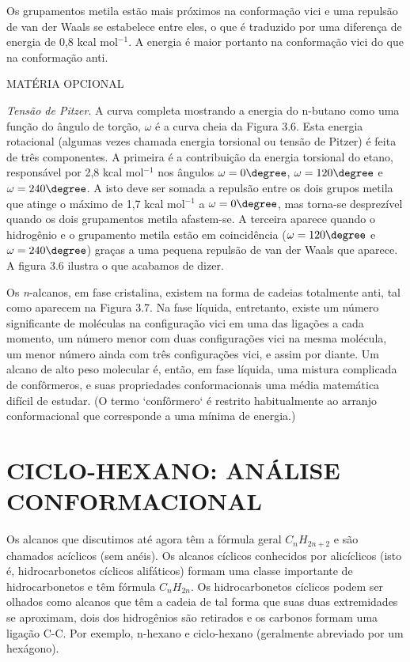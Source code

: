 Os grupamentos metila estão mais próximos na conformação vici e uma repulsão de van der Waals se estabelece entre eles, o que é traduzido por uma diferença de energia de 0,8 kcal mol$^{-1}$. A energia é maior portanto na conformação vici do que na conformação anti.

\par\bigskip
\begin{leftbar}[cut=false]
\footnotesize

\noindent MATÉRIA OPCIONAL

\noindent\emph{Tensão de Pitzer}. A curva completa mostrando a energia do n-butano como uma função do ângulo de torção, $\omega$ é a curva cheia da Figura 3.6. Esta energia rotacional (algumas vezes chamada energia torsional ou tensão de Pitzer) é feita de três componentes. A primeira é a contribuição da energia torsional do etano, responsável por 2,8 kcal mol$^{-1}$ nos ângulos $\omega=0\degree$, $\omega=120\degree$ e $\omega=240\degree$. A isto deve ser somada a repulsão entre os dois grupos metila que atinge o máximo de 1,7 kcal mol$^{-1}$ a $\omega=0\degree$, mas torna-se desprezível quando os dois grupamentos metila afastem-se. A terceira aparece quando o hidrogênio e o grupamento metila estão em coincidência ($\omega=120\degree$ e $\omega=240\degree$) graças a uma pequena repulsão de van der Waals que aparece. A figura 3.6 ilustra o que acabamos de dizer.
\end{leftbar}
\par\bigskip

Os \emph{n}-alcanos, em fase cristalina, existem na forma de cadeias totalmente anti, tal como aparecem na Figura 3.7. Na fase líquida, entretanto, existe um número significante de moléculas na configuração vici em uma das ligações a cada momento, um número menor com duas configurações vici na mesma molécula, um menor número ainda com três configurações vici, e assim por diante. Um alcano de alto peso molecular é, então, em fase líquida, uma mistura complicada de confôrmeros, e suas propriedades conformacionais uma média matemática difícil de estudar. (O termo `confôrmero` é restrito habitualmente ao arranjo conformacional que corresponde a uma mínima de energia.)

\section{CICLO-HEXANO: ANÁLISE CONFORMACIONAL}

Os alcanos que discutimos até agora têm a fórmula geral $C_{n}H_{2n+2}$ e são chamados acíclicos (sem anéis). Os alcanos cíclicos conhecidos por alicíclicos (isto é, hidrocarbonetos cíclicos alifáticos) formam uma classe importante de hidrocarbonetos e têm fórmula $C_{n}H_{2n}$. Os hidrocarbonetos cíclicos podem ser olhados como alcanos que têm a cadeia de tal forma que suas duas extremidades se aproximam, dois dos hidrogênios são retirados e os carbonos formam uma ligação C-C. Por exemplo, n-hexano e ciclo-hexano (geralmente abreviado por um hexágono).

